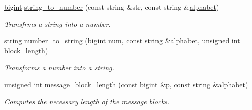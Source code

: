 \begin{DoxyCompactItemize}
\mbox{\hyperlink{namespaceelGamal_ab2883bf41ce8d738e2428c8ae81b0245}{bigint}} \mbox{\hyperlink{namespaceelGamal_1_1anonymous__namespace_02elGamal_8cpp_03_a7c87ed0fcfe81fb5eb26c6915de621a5}{string\+\_\+to\+\_\+number}} (const string \&str, const string \&\mbox{\hyperlink{namespaceelGamal_af54bb3d0000ef0479ad0d9f9ad7b1a6a}{alphabet}})
\begin{DoxyCompactList}\small\item\em Transfrms a string into a number. \end{DoxyCompactList}\item 
string \mbox{\hyperlink{namespaceelGamal_1_1anonymous__namespace_02elGamal_8cpp_03_ae7b9cdc894b5646eb4b76ee13e509cd5}{number\+\_\+to\+\_\+string}} (\mbox{\hyperlink{namespaceelGamal_ab2883bf41ce8d738e2428c8ae81b0245}{bigint}} num, const string \&\mbox{\hyperlink{namespaceelGamal_af54bb3d0000ef0479ad0d9f9ad7b1a6a}{alphabet}}, unsigned int block\+\_\+length)
\begin{DoxyCompactList}\small\item\em Transforms a number into a string. \end{DoxyCompactList}\item 
unsigned int \mbox{\hyperlink{namespaceelGamal_1_1anonymous__namespace_02elGamal_8cpp_03_a0b7b4b6f2e313fef83acd7d5918d42b5}{message\+\_\+block\+\_\+length}} (const \mbox{\hyperlink{namespaceelGamal_ab2883bf41ce8d738e2428c8ae81b0245}{bigint}} \&p, const string \&\mbox{\hyperlink{namespaceelGamal_af54bb3d0000ef0479ad0d9f9ad7b1a6a}{alphabet}})
\begin{DoxyCompactList}\small\item\em Computes the necessary length of the message blocks. \end{DoxyCompactList}\end{DoxyCompactItemize}

